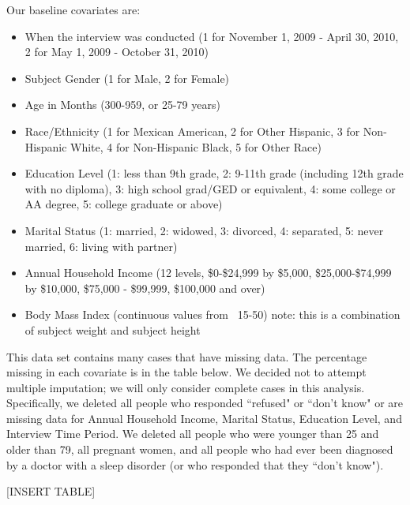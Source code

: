 \documentclass{article}
\begin{document}
Our baseline covariates are:
\begin{itemize}
\item When the interview was conducted (1 for November 1, 2009 - April 30, 2010, 2 for May 1, 2009 - October 31, 2010)
\item Subject Gender (1 for Male, 2 for Female)
\item Age in Months (300-959, or 25-79 years)
\item Race/Ethnicity (1 for Mexican American, 2 for Other Hispanic, 3 for Non-Hispanic White, 4 for Non-Hispanic Black, 5 for Other Race)
\item Education Level (1: less than 9th grade, 2: 9-11th grade (including 12th grade with no diploma), 3: high school grad/GED or equivalent, 4: some college or AA degree, 5: college graduate or above)
\item Marital Status (1: married, 2: widowed, 3: divorced, 4: separated, 5: never married, 6: living with partner)
\item Annual Household Income (12 levels, \$0-\$24,999 by \$5,000, \$25,000-\$74,999 by \$10,000,  \$75,000 - \$99,999, \$100,000 and over)
\item Body Mass Index (continuous values from ~15-50) note: this is a combination of subject weight and subject height
\end{itemize}

This data set contains many cases that have missing data.  The percentage missing in each covariate is in the table below.  We decided not to attempt multiple imputation; we will only consider complete cases in this analysis.  Specifically, we deleted all people who responded ``refused" or ``don't know" or are missing data for Annual Household Income, Marital Status, Education Level, and Interview Time Period.  We deleted all people who were younger than 25 and older than 79, all pregnant women, and all people who had ever been diagnosed by a doctor with a sleep disorder (or who responded that they ``don't know").  

[INSERT TABLE]

\end{document}
